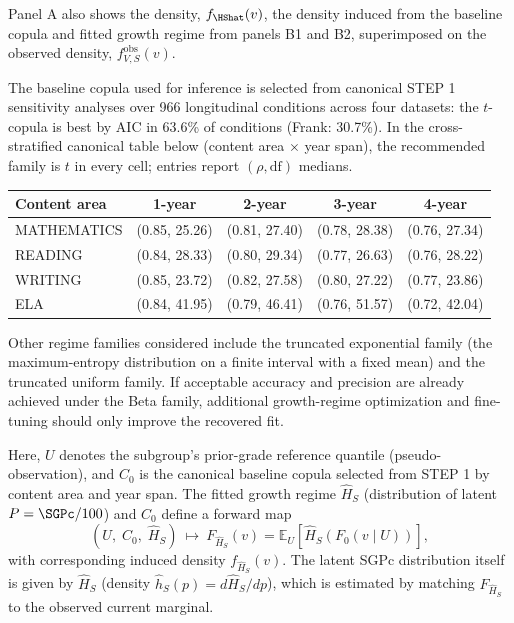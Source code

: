 \documentclass[10pt]{article}
\newlength{\fnlabelwidth}
\newcommand{\fnline}[2]{%
  \par\noindent
  \makebox[\fnlabelwidth][l]{$^{#1}$}%
  \parbox[t]{\dimexpr\linewidth-\fnlabelwidth\relax}{#2}%
  \par
}
\begin{document}
\vspace{0.60in}

\noindent
\hspace{0.5in}%
\begin{minipage}[t]{15.2in}
\small\raggedright
\setlength{\parskip}{0pt}

\fnline{1}{Panel A also shows the density, $f_{\HShat}(v)$, the density induced from the baseline copula and fitted growth regime from panels B1 and B2, superimposed on the observed density, $f^{\mathrm{obs}}_{V,S}(v)$.}

\vspace{4pt}
\fnline{2}{The baseline copula used for inference is selected from canonical STEP 1 sensitivity analyses over 966 longitudinal conditions across four datasets: the $t$-copula is best by AIC in 63.6\% of conditions (Frank: 30.7\%). In the cross-stratified canonical table below (content area $\times$ year span), the recommended family is $t$ in every cell; entries report $(\rho,\mathrm{df})$ medians.
\vspace{2pt}
\begin{center}
\begin{tabular}{@{}lcccc@{}}
\textbf{Content area} & \textbf{1-year} & \textbf{2-year} & \textbf{3-year} & \textbf{4-year} \\
\hline
\noalign{\vspace{2pt}}
MATHEMATICS & (0.85, 25.26) & (0.81, 27.40) & (0.78, 28.38) & (0.76, 27.34) \\
READING     & (0.84, 28.33) & (0.80, 29.34) & (0.77, 26.63) & (0.76, 28.22) \\
WRITING     & (0.85, 23.72) & (0.82, 27.58) & (0.80, 27.22) & (0.77, 23.86) \\
ELA         & (0.84, 41.95) & (0.79, 46.41) & (0.76, 51.57) & (0.72, 42.04) \\
\end{tabular}
\end{center}}

\vspace{6pt}
\fnline{3}{Other regime families considered include the truncated exponential family (the maximum-entropy distribution on a finite interval with a fixed mean) and the truncated uniform family. If acceptable accuracy and precision are already achieved under the Beta family, additional growth-regime optimization and fine-tuning should only improve the recovered fit.}

\vspace{4pt}
\fnline{4}{Here, $U$ denotes the subgroup's prior-grade reference quantile (pseudo-observation), and $C_0$ is the canonical baseline copula selected from STEP 1 by content area and year span. The fitted growth regime $\widehat{H}_S$ (distribution of latent $P=\SGPc/100$) and $C_0$ define a forward map
\[
(U,\;C_0,\;\widehat{H}_S)\ \longmapsto\ F_{\widehat{H}_S}(v)=\mathbb{E}_U\!\left[\widehat{H}_S\!\left(F_0(v\mid U)\right)\right],
\]
with corresponding induced density $f_{\widehat{H}_S}(v)$. The latent SGPc distribution itself is given by $\widehat{H}_S$ (density $\widehat{h}_S(p)=d\widehat{H}_S/dp$), which is estimated by matching $F_{\widehat{H}_S}$ to the observed current marginal.}


\end{minipage}
\end{document}
